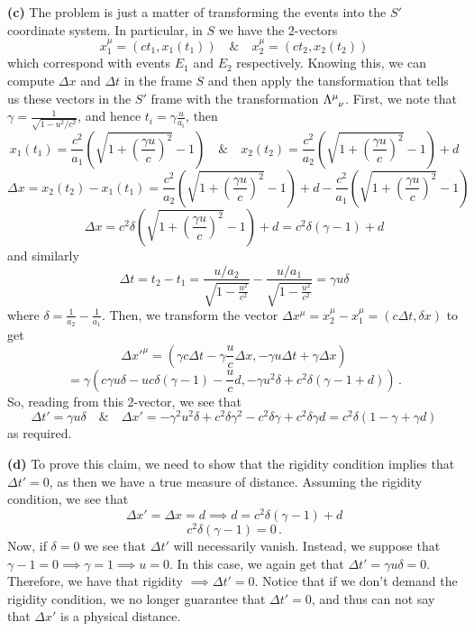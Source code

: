 \documentclass[10pt]{article}
\begin{document}
\textbf{(c)} The problem is just a matter of transforming the events into the $S'$ coordinate system. In particular, in $S$ we have the 2-vectors
\[ x^{\mu}_{1} = (ct_{1}, x_{1}(t_{1})) \quad \& \quad x^{\mu}_{2} = (ct_{2}, x_{2}(t_{2})) \]
which correspond with events $E_{1}$ and $E_{2}$ respectively. Knowing this, we can compute $\Delta x$ and $\Delta t$ in the frame $S$ and then apply the tansformation that tells us these vectors in the $S'$ frame with the transformation $\tensor{\Lambda}{^{\mu}_{\nu}}$. First, we note that $\gamma = \frac{1}{\sqrt{1 - u^{2}/c^{2}}}$, and hence $t_{i} = \gamma\frac{u}{a_{i}}$, then
\[ x_{1}(t_{1}) = \frac{c^{2}}{a_{1}}\left(\sqrt{1 + \left(\frac{\gamma u}{c}\right)^{2}} - 1\right)
\quad \& \quad x_{2}(t_{2}) = \frac{c^{2}}{a_{2}}\left(\sqrt{1 + \left(\frac{\gamma u}{c}\right)^{2}} - 1\right) + d
\]
\[ \Delta x = x_{2}(t_{2}) - x_{1}(t_{1}) = \frac{c^{2}}{a_{2}}\left(\sqrt{1 + \left(\frac{\gamma u}{c}\right)^{2}} - 1\right) + d - \frac{c^{2}}{a_{1}}\left(\sqrt{1 + \left(\frac{\gamma u}{c}\right)^{2}} - 1\right) \]
\[ \Delta x = c^{2}\delta\left(\sqrt{1 + \left(\frac{\gamma u}{c}\right)^{2}} - 1\right) + d = c^{2}\delta\left(\gamma - 1\right) + d\]
and similarly
\[\Delta t = t_{2} - t_{1} = \frac{u/a_{2}}{\sqrt{1 - \frac{u^{2}}{c^{2}}}} - \frac{u/a_{1}}{\sqrt{1 - \frac{u^{2}}{c^{2}}}} = \gamma u \delta \]
where $\delta = \frac{1}{a_{2}} - \frac{1}{a_{1}}$. Then, we transform the vector $\Delta x^{\mu} = x_{2}^{\mu} - x_{1}^{\mu} = (c\Delta t, \delta x)$ to get
\[ \Delta x'^{\mu} = \left(\gamma c\Delta t - \gamma \frac{u}{c}\Delta x, -\gamma u \Delta t + \gamma \Delta x\right) \]
\[ = \gamma \left(
c\gamma u\delta - uc\delta \left(\gamma - 1\right) - \frac{u}{c}d,
-\gamma u^{2}\delta + c^{2}\delta\left(\gamma - 1 + d\right)
\right)\, .\]
So, reading from this 2-vector, we see that
\[
\Delta t' = \gamma u\delta
\quad \& \quad
\Delta x' = -\gamma^{2} u^{2}\delta + c^{2}\delta \gamma^{2} - c^{2}\delta\gamma + c^{2}\delta \gamma d = c^{2}\delta(1- \gamma + \gamma d)
\]
as required.

\textbf{(d)} To prove this claim, we need to show that the rigidity condition implies that $\Delta t' = 0$, as then we have a true measure of distance. Assuming the rigidity condition, we see that
\[ \Delta x' = \Delta x = d \implies d = c^{2}\delta\left(\gamma - 1\right) + d\]
\[ c^{2}\delta\left(\gamma - 1\right) = 0\, .\]
Now, if $\delta = 0$ we see that $\Delta t'$ will necessarily vanish. Instead, we suppose that $\gamma - 1 = 0 \implies \gamma = 1 \implies u = 0$. In this case, we again get that $\Delta t' = \gamma u \delta = 0$. Therefore, we have that rigidity $\implies \Delta t' = 0$. Notice that if we don't demand the rigidity condition, we no longer guarantee that $\Delta t' = 0$, and thus can not say that $\Delta x'$ is a physical distance.
\end{document}
